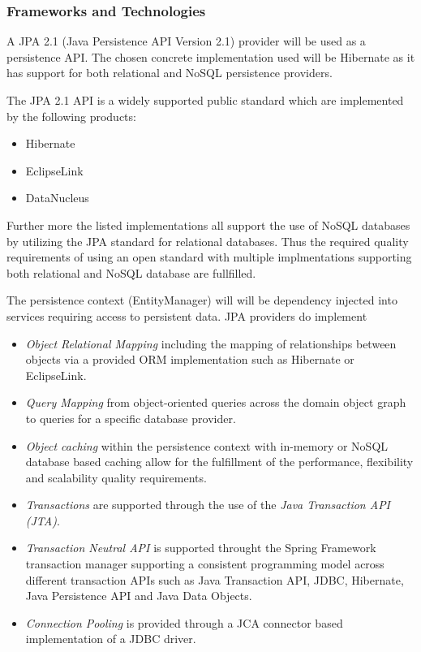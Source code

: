 \subsubsection{Frameworks and Technologies}
A JPA 2.1 (Java Persistence API Version 2.1) provider will be used as a
persistence API. The chosen concrete implementation used will be Hibernate as
it has support for both relational and NoSQL persistence providers.

The JPA 2.1 API is a widely supported public standard which are implemented by
the following products:
\begin{itemize}
	\item Hibernate
	\item EclipseLink
	\item DataNucleus
\end{itemize}

Further more the listed implementations all support the use of NoSQL databases
by utilizing the JPA standard for relational databases. Thus the required
quality requirements of using an open standard with multiple implmentations
supporting both relational and NoSQL database are fullfilled.

The persistence context (EntityManager) will will be dependency injected into
services requiring access to persistent data. JPA providers do implement
\begin{itemize}
	\item \textit{Object Relational Mapping} including the mapping of
		relationships between objects via a provided ORM
		implementation such as Hibernate or EclipseLink.
	\item \textit{Query Mapping} from object-oriented queries across the
		domain object graph to queries for a specific database provider.
	\item \textit{Object caching} within the persistence context with
		in-memory or NoSQL database based caching allow for the
		fulfillment of the performance, flexibility and scalability
		quality requirements.
	\item \textit{Transactions} are supported through the use of the \textit{Java Transaction API (JTA)}.
	\item \textit{Transaction Neutral API} is supported throught the Spring
		Framework transaction manager supporting a consistent programming
		model across different transaction APIs such as
		Java Transaction API, JDBC, Hibernate, Java Persistence API and
		Java Data Objects.
	\item \textit{Connection Pooling} is provided through a JCA connector
		based implementation of a JDBC driver.
\end{itemize}

